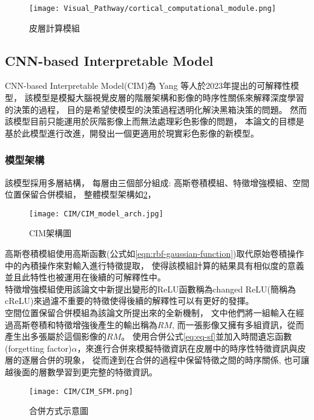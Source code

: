\documentclass[class=NCU_thesis, crop=false]{standalone}
\begin{document}
\begin{figure}[H]
  \centering
  \texttt{[image: Visual\_Pathway/cortical\_computational\_module.png]}
  \caption{皮層計算模組~\cite{1180370208}}
  \label{fig:CorticalComputationalModule}
\end{figure}
\pagebreak


\subsection{CNN-based Interpretable Model}
CNN-based Interpretable Model(CIM)\cite{YangCNNInterpretable}為 Yang 等人於2023年提出的可解釋性模型，
該模型是模擬大腦視覺皮層的階層架構和影像的時序性關係來解釋深度學習的決策的過程，
目的是希望使模型的決策過程透明化解決黑箱決策的問題。
然而該模型目前只能運用於灰階影像上而無法處理彩色影像的問題，
本論文的目標是基於此模型進行改進，開發出一個更適用於現實彩色影像的新模型。

\subsubsection{模型架構}
該模型採用多層結構，
每層由三個部分組成: 高斯卷積模組、特徵增強模組、空間位置保留合併模組，
整體模型架構如\cref{fig:CIM_arch}，
\begin{figure}[H]
  \centering
  \texttt{[image: CIM/CIM\_model\_arch.jpg]}
  \caption{CIM架構圖~\cite{YangCNNInterpretable}}
  \label{fig:CIM_arch}
\end{figure}


高斯卷積模組使用高斯函數(公式如\cref{eqn:rbf-gaussian-function})取代原始卷積操作中的內積操作來對輸入進行特徵提取，
使得該模組計算的結果具有相似度的意義並且此特性也被運用在後續的可解釋性中。\\
特徵增強模組使用該論文中新提出變形的ReLU函數稱為changed ReLU(簡稱為cReLU)來過濾不重要的特徵使得後續的解釋性可以有更好的發揮。\\

空間位置保留合併模組為該論文所提出來的全新機制，
文中他們將一組輸入在經過高斯卷積和特徵增強後產生的輸出稱為$RM$,
而一張影像又擁有多組資訊，從而產生出多張屬於這個影像的$RM$。
使用合併公式\cref{eq:eq-sf}並加入時間遺忘函數(forgetting factor)$\alpha$，來進行合併來模擬特徵資訊在皮層中的時序性特徵資訊與皮層的逐層合併的現象，
從而達到在合併的過程中保留特徵之間的時序關係,
也可讓越後面的層數學習到更完整的特徵資訊。\\
\begin{figure}[H]
  \centering
  \texttt{[image: CIM/CIM\_SFM.png]}
  \caption{合併方式示意圖~\cite{YangCNNInterpretable}}
  \label{fig:CIM_SFM}
\end{figure}
\end{document}
